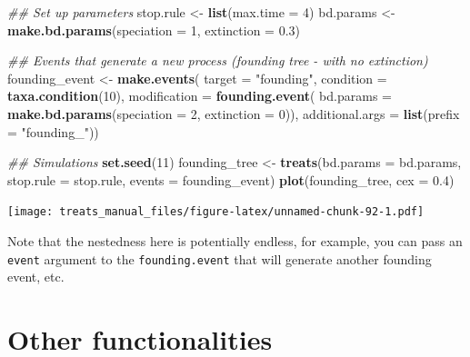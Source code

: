 \documentclass[
]{book}
\newenvironment{Shaded}{\begin{snugshade}}{\end{snugshade}}
\newcommand{\CommentTok}[1]{\textcolor[rgb]{0.56,0.35,0.01}{\textit{#1}}}
\newcommand{\DataTypeTok}[1]{\textcolor[rgb]{0.13,0.29,0.53}{#1}}
\newcommand{\DecValTok}[1]{\textcolor[rgb]{0.00,0.00,0.81}{#1}}
\newcommand{\FloatTok}[1]{\textcolor[rgb]{0.00,0.00,0.81}{#1}}
\newcommand{\KeywordTok}[1]{\textcolor[rgb]{0.13,0.29,0.53}{\textbf{#1}}}
\newcommand{\NormalTok}[1]{#1}
\newcommand{\StringTok}[1]{\textcolor[rgb]{0.31,0.60,0.02}{#1}}
\begin{document}
\begin{Shaded}
\begin{Highlighting}[]
\CommentTok{\#\# Set up parameters}
\NormalTok{stop.rule \textless{}{-}}\StringTok{ }\KeywordTok{list}\NormalTok{(}\DataTypeTok{max.time =} \DecValTok{4}\NormalTok{)}
\NormalTok{bd.params \textless{}{-}}\StringTok{ }\KeywordTok{make.bd.params}\NormalTok{(}\DataTypeTok{speciation =} \DecValTok{1}\NormalTok{, }\DataTypeTok{extinction =} \FloatTok{0.3}\NormalTok{)}

\CommentTok{\#\# Events that generate a new process (founding tree {-} with no extinction)}
\NormalTok{founding\_event \textless{}{-}}\StringTok{ }\KeywordTok{make.events}\NormalTok{(}
                  \DataTypeTok{target =} \StringTok{"founding"}\NormalTok{,}
                  \DataTypeTok{condition =} \KeywordTok{taxa.condition}\NormalTok{(}\DecValTok{10}\NormalTok{),}
                  \DataTypeTok{modification =} \KeywordTok{founding.event}\NormalTok{(}
                                    \DataTypeTok{bd.params =} \KeywordTok{make.bd.params}\NormalTok{(}\DataTypeTok{speciation =} \DecValTok{2}\NormalTok{,}
                                                               \DataTypeTok{extinction =} \DecValTok{0}\NormalTok{)),}
                  \DataTypeTok{additional.args =} \KeywordTok{list}\NormalTok{(}\DataTypeTok{prefix =} \StringTok{"founding\_"}\NormalTok{))}
    
\CommentTok{\#\# Simulations}
\KeywordTok{set.seed}\NormalTok{(}\DecValTok{11}\NormalTok{)}
\NormalTok{founding\_tree \textless{}{-}}\StringTok{ }\KeywordTok{treats}\NormalTok{(}\DataTypeTok{bd.params =}\NormalTok{ bd.params,}
                      \DataTypeTok{stop.rule =}\NormalTok{ stop.rule,}
                      \DataTypeTok{events =}\NormalTok{ founding\_event)}
\KeywordTok{plot}\NormalTok{(founding\_tree, }\DataTypeTok{cex =} \FloatTok{0.4}\NormalTok{)}
\end{Highlighting}
\end{Shaded}

\texttt{[image: treats\_manual\_files/figure-latex/unnamed-chunk-92-1.pdf]}

Note that the nestedness here is potentially endless, for example, you can pass an \texttt{event} argument to the \texttt{founding.event} that will generate another founding event, etc.

\hypertarget{others}{%
\chapter{Other functionalities}\label{others}}
\end{document}
